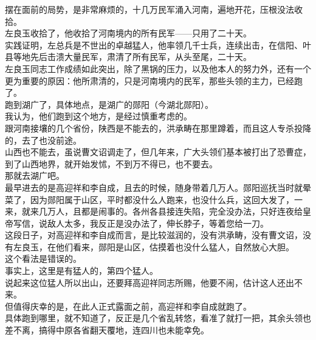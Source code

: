 \begin{multicols}{\theparacolNo}
摆在面前的局势，是非常麻烦的，十几万民军涌入河南，遍地开花，压根没法收拾。\\

左良玉收拾了，他收拾了河南境内的所有民军——只用了二十天。\\

实践证明，左总兵是不世出的卓越猛人，他率领几千士兵，连续出击，在信阳、叶县等地先后击溃大量民军，肃清了所有民军，从头至尾，二十天。\\

左良玉同志工作成绩如此突出，除了黑锅的压力，以及他本人的努力外，还有一个更为重要的原因：他所肃清的，只是河南境内的民军，那些头领的主力，已经跑了。\\

跑到湖广了，具体地点，是湖广的郧阳（今湖北郧阳）。\\

我认为，他们跑到这个地方，是经过慎重考虑的。\\

跟河南接壤的几个省份，陕西是不能去的，洪承畴在那里蹲着，而且这人专杀投降的，去了也没前途。\\

山西也不能去，虽说曹文诏调走了，但几年来，广大头领们基本被打出了恐曹症，到了山西地界，就开始发怵，不到万不得已，也不要去。\\

那就去湖广吧。\\

最早进去的是高迎祥和李自成，且去的时候，随身带着几万人。郧阳巡抚当时就晕菜了，因为郧阳属于山区，平时都没什么人跑来，也没什么兵，这回大发了，一来，就来几万人，且都是闹事的。各州各县接连失陷，完全没办法，只好连夜给皇帝写信，说敌人太多，我反正是没办法了，伸长脖子，等着您给一刀。\\

这段日子，对高迎祥和李自成而言，是比较滋润的，没有洪承畴，没有曹文诏，没有左良玉，在他们看来，郧阳是山区，估摸着也没什么猛人，自然放心大胆。\\

这个看法是错误的。\\

事实上，这里是有猛人的，第四个猛人。\\

说起来这位猛人所以出山，还要拜高迎祥同志所赐，他要不闹，估计这人还出不来。\\

但值得庆幸的是，在此人正式露面之前，高迎祥和李自成就跑了。\\

具体跑到哪里，就不知道了，反正是几个省乱转悠，看准了就打一把，其余头领也差不离，搞得中原各省翻天覆地，连四川也未能幸免。\\


\end{multicols}
